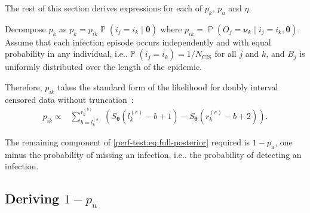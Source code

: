 \documentclass[12pt]{article}
\makeatletter
\DeclareMathOperator{\prob}{\mathbb{P}}
\renewcommand{\vec}[1]{\bm{#1}}
\newcommand{\Ncis}{N_\text{CIS}}
\DeclareRobustCommand\onedot{\futurelet\@let@token\@onedot}
\def\@onedot{\ifx\@let@token.\else.\null\fi\xspace}
\def\ie{i.e\onedot} \def\Ie{{I.e}\onedot}
\makeatother
\begin{document}
The rest of this section derives expressions for each of $p_{k}$, $p_{u}$ and $\eta$.

Decompose $p_k$ as $p_k = p_{ik} \prob(i_j = i_k \mid \vec{\theta})$
where $p_{ik} = \prob(O_j = \vec{\nu}_k \mid i_j = i_k, \vec{\theta})$.
Assume that each infection episode occurs independently and with equal probability in any individual, \ie $\prob(i_j = i_k) = 1/\Ncis$ for all $j$ and $k$, and $B_j$ is uniformly distributed over the length of the epidemic.

Therefore, $p_{ik}$ takes the standard form of the likelihood for doubly interval censored data without truncation~\citep[e.g.][]{sunEmpirical}:
\begin{align}
p_{ik}
\propto& \sum_{b = l_k^{(b)}}^{r_k^{(b)}} \left( S_{\vec{\theta}}(l_k^{(e)} - b + 1) - S_{\vec{\theta}}(r_k^{(e)} - b + 2) \right).
\label{perf-test:eq:pia}
\end{align}

The remaining component of \cref{perf-test:eq:full-posterior} required is $1- p_u$, one minus the probability of missing an infection, \ie the probability of detecting an infection.

\subsection{Deriving $1 - p_u$} \label{sec:prob-undetected}
\end{document}
